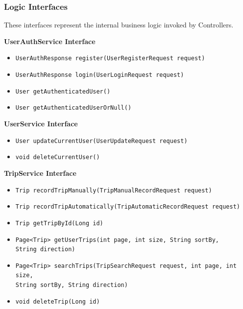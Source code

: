 \subsubsection{Logic Interfaces}
These interfaces represent the internal business logic invoked by Controllers.

\textbf{UserAuthService Interface}
\begin{itemize}
    \item \texttt{UserAuthResponse register(UserRegisterRequest request)}
    \item \texttt{UserAuthResponse login(UserLoginRequest request)}
    \item \texttt{User getAuthenticatedUser()}
    \item \texttt{User getAuthenticatedUserOrNull()}
\end{itemize}

\textbf{UserService Interface}
\begin{itemize}
    \item \texttt{User updateCurrentUser(UserUpdateRequest request)}
    \item \texttt{void deleteCurrentUser()}
\end{itemize}

\textbf{TripService Interface}
\begin{itemize}
    \item \texttt{Trip recordTripManually(TripManualRecordRequest request)}
    \item \texttt{Trip recordTripAutomatically(TripAutomaticRecordRequest request)}
    \item \texttt{Trip getTripById(Long id)}
    \item \texttt{Page<Trip> getUserTrips(int page, int size, String sortBy, \\ String direction)}
    \item \texttt{Page<Trip> searchTrips(TripSearchRequest request, int page, int size, \\ String sortBy, String direction)}
    \item \texttt{void deleteTrip(Long id)}
\end{itemize}

